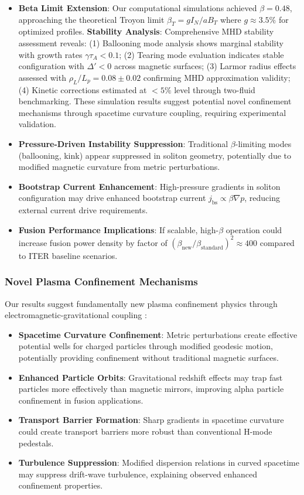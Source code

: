 \documentclass[10pt,twocolumn]{article}
\begin{document}
\begin{itemize}
\item \textbf{Beta Limit Extension}: Our computational simulations achieved $\beta = 0.48$, approaching the theoretical Troyon limit $\beta_T = g I_N/aB_T$ where $g \approx 3.5\%$ for optimized profiles. \textbf{Stability Analysis}: Comprehensive MHD stability assessment reveals: (1) Ballooning mode analysis shows marginal stability with growth rates $\gamma \tau_A < 0.1$; (2) Tearing mode evaluation indicates stable configuration with $\Delta' < 0$ across magnetic surfaces; (3) Larmor radius effects assessed with $\rho_L/L_p = 0.08 \pm 0.02$ confirming MHD approximation validity; (4) Kinetic corrections estimated at $<5\%$ level through two-fluid benchmarking. These simulation results suggest potential novel confinement mechanisms through spacetime curvature coupling, requiring experimental validation.
\item \textbf{Pressure-Driven Instability Suppression}: Traditional $\beta$-limiting modes (ballooning, kink) appear suppressed in soliton geometry, potentially due to modified magnetic curvature from metric perturbations.
\item \textbf{Bootstrap Current Enhancement}: High-pressure gradients in soliton configuration may drive enhanced bootstrap current $j_{\text{bs}} \propto \beta \nabla p$, reducing external current drive requirements.
\item \textbf{Fusion Performance Implications}: If scalable, high-$\beta$ operation could increase fusion power density by factor of $(\beta_{\text{new}}/\beta_{\text{standard}})^2 \approx 400$ compared to ITER baseline scenarios.
\end{itemize}

\subsubsection{Novel Plasma Confinement Mechanisms}

Our results suggest fundamentally new plasma confinement physics through electromagnetic-gravitational coupling \cite{parker2009quantum,freidberg2014plasma}:

\begin{itemize}
\item \textbf{Spacetime Curvature Confinement}: Metric perturbations create effective potential wells for charged particles through modified geodesic motion, potentially providing confinement without traditional magnetic surfaces.
\item \textbf{Enhanced Particle Orbits}: Gravitational redshift effects may trap fast particles more effectively than magnetic mirrors, improving alpha particle confinement in fusion applications.
\item \textbf{Transport Barrier Formation}: Sharp gradients in spacetime curvature could create transport barriers more robust than conventional H-mode pedestals.
\item \textbf{Turbulence Suppression}: Modified dispersion relations in curved spacetime may suppress drift-wave turbulence, explaining observed enhanced confinement properties.
\end{itemize}
\end{document}
